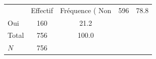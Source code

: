 {
\def\sym#1{\ifmmode^{#1}\else\(^{#1}\)\fi}
\begin{tabular}{l*{1}{cc}}
\toprule
            &    Effectif&Fréquence (%
\midrule
Non         &         596&        78.8\\
Oui         &         160&        21.2\\
Total       &         756&       100.0\\
\midrule
\(N\)       &         756&            \\
\bottomrule
\end{tabular}
}
